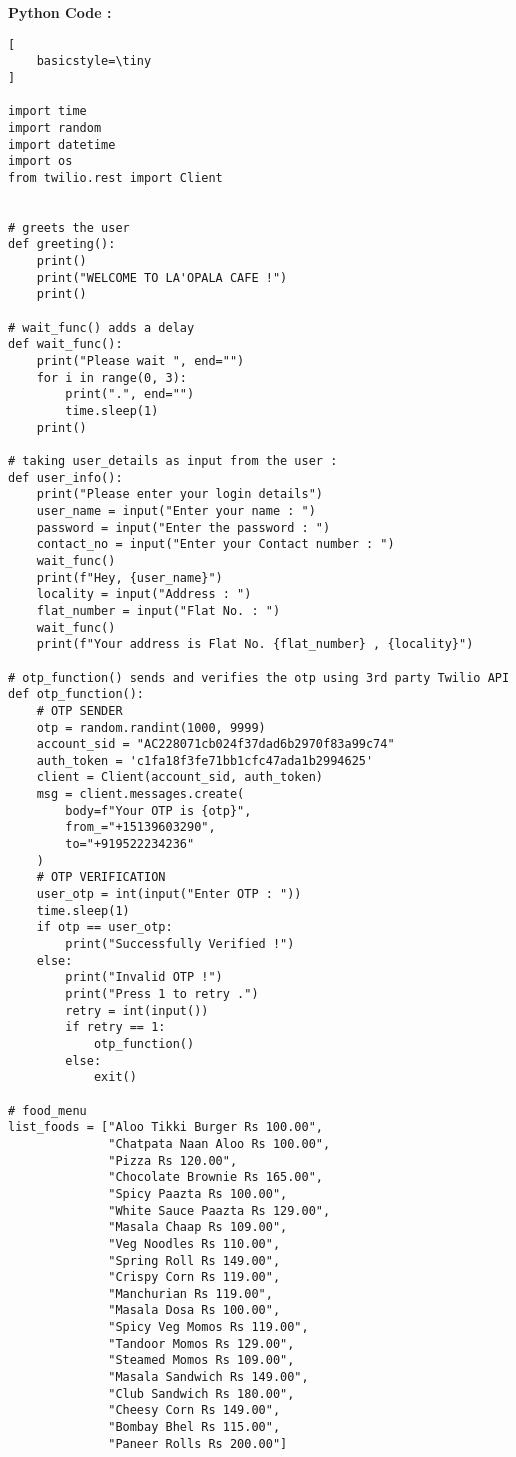 \documentclass[11pt, a4paper]{article}
\begin{document}
\newpage
\textbf{ Python Code :}
\begin{lstlisting}[
    basicstyle=\tiny
]

import time
import random
import datetime
import os
from twilio.rest import Client


# greets the user
def greeting():
    print()
    print("WELCOME TO LA'OPALA CAFE !")
    print()

# wait_func() adds a delay
def wait_func():
    print("Please wait ", end="")
    for i in range(0, 3):
        print(".", end="")
        time.sleep(1)
    print()

# taking user_details as input from the user :
def user_info():
    print("Please enter your login details")
    user_name = input("Enter your name : ")
    password = input("Enter the password : ")
    contact_no = input("Enter your Contact number : ")
    wait_func()
    print(f"Hey, {user_name}")
    locality = input("Address : ")
    flat_number = input("Flat No. : ")
    wait_func()
    print(f"Your address is Flat No. {flat_number} , {locality}")

# otp_function() sends and verifies the otp using 3rd party Twilio API
def otp_function():
    # OTP SENDER
    otp = random.randint(1000, 9999)
    account_sid = "AC228071cb024f37dad6b2970f83a99c74"
    auth_token = 'c1fa18f3fe71bb1cfc47ada1b2994625'
    client = Client(account_sid, auth_token)
    msg = client.messages.create(
        body=f"Your OTP is {otp}",
        from_="+15139603290",
        to="+919522234236"
    )
    # OTP VERIFICATION
    user_otp = int(input("Enter OTP : "))
    time.sleep(1)
    if otp == user_otp:
        print("Successfully Verified !")
    else:
        print("Invalid OTP !")
        print("Press 1 to retry .")
        retry = int(input())
        if retry == 1:
            otp_function()
        else:
            exit()

# food_menu
list_foods = ["Aloo Tikki Burger Rs 100.00",
              "Chatpata Naan Aloo Rs 100.00",
              "Pizza Rs 120.00",
              "Chocolate Brownie Rs 165.00",
              "Spicy Paazta Rs 100.00",
              "White Sauce Paazta Rs 129.00",
              "Masala Chaap Rs 109.00",
              "Veg Noodles Rs 110.00",
              "Spring Roll Rs 149.00",
              "Crispy Corn Rs 119.00",
              "Manchurian Rs 119.00",
              "Masala Dosa Rs 100.00",
              "Spicy Veg Momos Rs 119.00",
              "Tandoor Momos Rs 129.00",
              "Steamed Momos Rs 109.00",
              "Masala Sandwich Rs 149.00",
              "Club Sandwich Rs 180.00",
              "Cheesy Corn Rs 149.00",
              "Bombay Bhel Rs 115.00",
              "Paneer Rolls Rs 200.00"]


\end{lstlisting}
\end{document}
